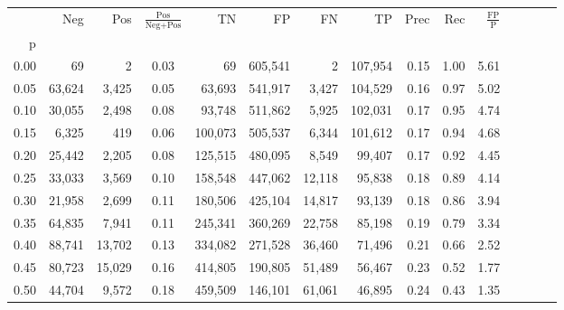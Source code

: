 \begin{tabular}{rrrcrrrrrrrrrrr}
\toprule
{} &     Neg &     Pos & $\frac{\text{Pos}}{\text{Neg}+\text{Pos}}$ &       TN &       FP &       FN &       TP &  Prec &   Rec & $\frac{\text{FP}}{\text{P}}$ \\
p    &         &         &                                            &          &          &          &          &       &       &                              \\
\midrule
0.00 &      69 &       2 &                                       0.03 &       69 &  605,541 &        2 &  107,954 &  0.15 &  1.00 &                         5.61 \\
0.05 &  63,624 &   3,425 &                                       0.05 &   63,693 &  541,917 &    3,427 &  104,529 &  0.16 &  0.97 &                         5.02 \\
0.10 &  30,055 &   2,498 &                                       0.08 &   93,748 &  511,862 &    5,925 &  102,031 &  0.17 &  0.95 &                         4.74 \\
0.15 &   6,325 &     419 &                                       0.06 &  100,073 &  505,537 &    6,344 &  101,612 &  0.17 &  0.94 &                         4.68 \\
0.20 &  25,442 &   2,205 &                                       0.08 &  125,515 &  480,095 &    8,549 &   99,407 &  0.17 &  0.92 &                         4.45 \\
0.25 &  33,033 &   3,569 &                                       0.10 &  158,548 &  447,062 &   12,118 &   95,838 &  0.18 &  0.89 &                         4.14 \\
0.30 &  21,958 &   2,699 &                                       0.11 &  180,506 &  425,104 &   14,817 &   93,139 &  0.18 &  0.86 &                         3.94 \\
0.35 &  64,835 &   7,941 &                                       0.11 &  245,341 &  360,269 &   22,758 &   85,198 &  0.19 &  0.79 &                         3.34 \\
0.40 &  88,741 &  13,702 &                                       0.13 &  334,082 &  271,528 &   36,460 &   71,496 &  0.21 &  0.66 &                         2.52 \\
0.45 &  80,723 &  15,029 &                                       0.16 &  414,805 &  190,805 &   51,489 &   56,467 &  0.23 &  0.52 &                         1.77 \\
0.50 &  44,704 &   9,572 &                                       0.18 &  459,509 &  146,101 &   61,061 &   46,895 &  0.24 &  0.43 &                         1.35 \\

\end{tabular}
